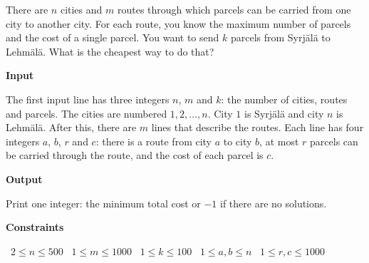 There are $n$ cities and $m$ routes through which parcels can be carried from one city to another city. For each route, you know the maximum number of parcels and the cost of a single parcel.
You want to send $k$ parcels from Syrjälä to Lehmälä. What is the cheapest way to do that?

\vspace{0.3cm}\noindent\textbf{Input}

The first input line has three integers $n$, $m$ and $k$: the number of cities, routes and parcels. The cities are numbered $1,2,\dots,n$. City $1$ is Syrjälä and city $n$ is Lehmälä.
After this, there are $m$ lines that describe the routes. Each line has four integers $a$, $b$, $r$ and $c$: there is a route from city $a$ to city $b$, at most $r$ parcels can be carried through the route, and the cost of each parcel is $c$.

\vspace{0.3cm}\noindent\textbf{Output}

Print one integer: the minimum total cost or $-1$ if there are no solutions.

\vspace{0.3cm}\noindent\textbf{Constraints}

\textbullet\ $2 \le n \le 500$
\textbullet\ $1 \le m \le 1000$
\textbullet\ $1 \le k \le 100$
\textbullet\ $1 \le a,b \le n$
\textbullet\ $1 \le r,c \le 1000$